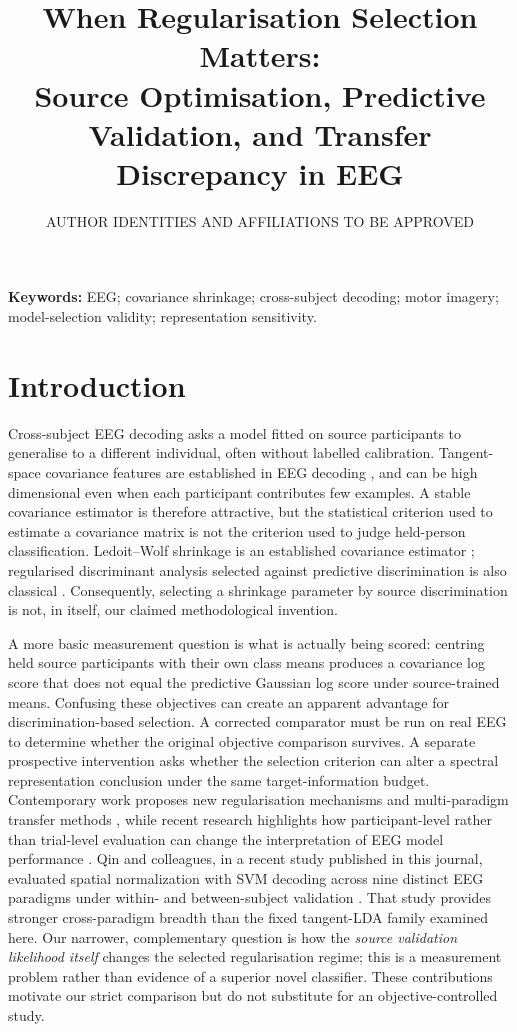 \documentclass[11pt,a4paper]{article}
\title{When Regularisation Selection Matters:\\
Source Optimisation, Predictive Validation, and Transfer Discrepancy in EEG}
\author{AUTHOR IDENTITIES AND AFFILIATIONS TO BE APPROVED}
\date{}
\begin{document}
\maketitle

\noindent\textbf{Keywords:} EEG; covariance shrinkage; cross-subject decoding;
motor imagery; model-selection validity; representation sensitivity.

\section{Introduction}
Cross-subject EEG decoding asks a model fitted on source participants to
generalise to a different individual, often without labelled calibration.
Tangent-space covariance features are established in EEG decoding
\cite{barachant2012riemannian}, and can be high dimensional even
when each participant contributes few examples. A stable covariance estimator is therefore
attractive, but the statistical criterion used to estimate a covariance
matrix is not the criterion used to judge held-person classification.
Ledoit--Wolf shrinkage is an established covariance estimator
\cite{ledoit2004}; regularised discriminant analysis selected against
predictive discrimination is also classical \cite{friedman1989}.
Consequently, selecting a shrinkage parameter by source discrimination
is not, in itself, our claimed methodological invention.

A more basic measurement question is what is actually being scored:
centring held source participants with their own class means produces a
covariance log score that does not equal the predictive Gaussian log score
under source-trained means. Confusing these objectives can create an
apparent advantage for discrimination-based selection. A corrected
comparator must be run on real EEG to determine whether the original
objective comparison survives. A separate prospective intervention asks
whether the selection criterion can alter a spectral representation
conclusion under the same target-information budget. Contemporary work proposes
new regularisation mechanisms and multi-paradigm transfer methods
\cite{miao2025freezing,morvay2026wbt,he2026cyclic}, while recent research highlights
how participant-level rather than trial-level evaluation can change the
interpretation of EEG model performance \cite{gil2026subjectvalidation}.
Qin and colleagues, in a recent study published in this journal,
evaluated spatial normalization with SVM decoding across nine
distinct EEG paradigms under within- and between-subject validation
\cite{qin2026spatialnorm}. That study provides stronger
cross-paradigm breadth than the fixed tangent-LDA family examined here.
Our narrower, complementary question is how the \emph{source
validation likelihood itself} changes the selected
regularisation regime; this is a measurement problem rather
than evidence of a superior novel classifier.
These contributions motivate our strict comparison but do not substitute
for an objective-controlled study.
\end{document}
